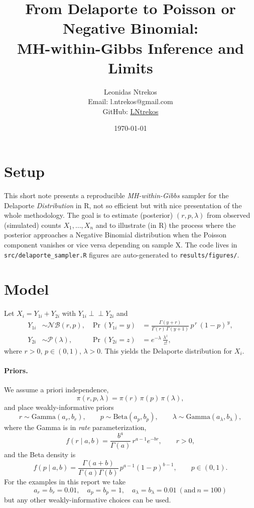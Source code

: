 \documentclass[11pt,a4paper]{article}
\title{\textbf{From Delaporte to Poisson or Negative Binomial: \\ MH-within-Gibbs Inference and Limits}}
\author{Leonidas Ntrekos \\ \small Email: l.ntrekos@gmail.com \\ \small GitHub:  \href{https://github.com/LNtrekos}{LNtrekos}}
\date{\today}
\theoremstyle{definition}
\theoremstyle{remark}
\newcommand{\indep}{\perp\!\!\!\perp}
\begin{document}
\maketitle
\sloppy %

    \section{Setup}
    This short note presents a reproducible \emph{MH-within-Gibbs} sampler for the Delaporte \emph{Distribution} in R, not so efficient but with nice presentation of the whole methodology. The goal is to estimate (posterior) $(r,p,\lambda)$ from observed (simulated) counts $X_1,\dots,X_n$ and to illustrate (in R) the process where the posterior approaches a Negative Binomial distribution when the Poisson component vanishes or vice versa depending on sample X. The code lives in \texttt{src/delaporte\_sampler.R} figures are auto-generated to \texttt{results/figures/}. 
    
    \section{Model}
    Let $X_i = Y_{1i} + Y_{2i}$ with $Y_{1i} \indep Y_{2i}$ and
    \begin{align*}
    Y_{1i} &\sim \mathcal{NB}(r, p), & \Pr(Y_{1i}=y) &= \frac{\Gamma(y+r)}{\Gamma(r)\,\Gamma(y+1)}\, p^{\,r}\,(1-p)^{\,y}, \\
    Y_{2i} &\sim \mathcal{P}(\lambda), & \Pr(Y_{2i}=z) &= e^{-\lambda}\,\frac{\lambda^{z}}{z!},
    \end{align*}
    where $r>0$, $p\in(0,1)$, $\lambda>0$. This yields the Delaporte distribution for $X_i$.
    
    \paragraph{Priors.}
    We assume a priori independence,
    \[
    \pi(r,p,\lambda)=\pi(r)\,\pi(p)\,\pi(\lambda),
    \]
    and place weakly-informative priors
    \[
    r \sim \mathrm{Gamma}(a_r,b_r), \qquad
    p \sim \mathrm{Beta}(a_p,b_p), \qquad
    \lambda \sim \mathrm{Gamma}(a_\lambda,b_\lambda),
    \]
    where the Gamma is in \emph{rate} parameterization,
    \[
    f(r\mid a,b)=\frac{b^{a}}{\Gamma(a)}\, r^{a-1} e^{-b r}, \qquad r>0,
    \]
    and the Beta density is
    \[
    f(p\mid a,b)=\frac{\Gamma(a+b)}{\Gamma(a)\Gamma(b)}\, p^{a-1}(1-p)^{b-1}, \qquad p\in(0,1).
    \]
    For the examples in this report we take
    \[
    a_r=b_r=0.01,\quad a_p=b_p=1,\quad a_\lambda=b_\lambda=0.01 \ (\text{and} \ n = 100) 
    \]
    but any other weakly-informative choices can be used.
    
\end{document}
